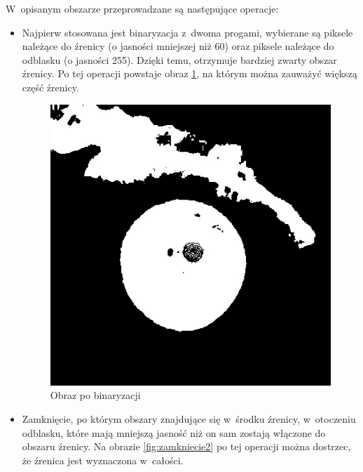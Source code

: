 W~opisanym obszarze przeprowadzane są następujące operacje:
\begin{itemize}
\item Najpierw stosowana jest binaryzacja z~dwoma progami, wybierane są piksele należące do źrenicy (o jasności mniejszej niż 60) oraz piksele należące do odblasku (o jasności 255). Dzięki temu, otrzymuje bardziej zwarty obszar źrenicy. Po tej operacji powstaje obraz \ref{fig:binaryzacja2}, na którym można zauważyć większą część źrenicy.
\begin{figure}[h!]
\begin{center}
\includegraphics[scale=0.4]{binaryzacja2.jpg}
\caption{Obraz po binaryzacji}
\label{fig:binaryzacja2}
\end{center}
\end{figure}
\item Zamknięcie, po którym obszary znajdujące się w~środku źrenicy, w~otoczeniu odblasku, które mają mniejszą jasność niż on sam zostają włączone do obszaru źrenicy. Na obrazie \ref{fig:zamkniecie2} po tej operacji można dostrzec, że źrenica jest wyznaczona w~całości.
\begin{figure}[h!]
\begin{center}

\end{center}
\end{figure}
\end{itemize}
